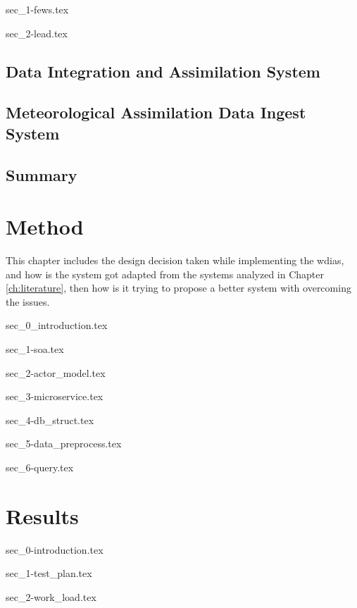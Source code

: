\documentclass[a4paper,oneside,12pt]{report}
\begin{document}
{sec_1-fews.tex}

{sec_2-lead.tex}

\section{Data Integration and Assimilation System}
\label{se:dias}

\section{Meteorological Assimilation Data Ingest System}
\label{se:madis}

\section{Summary}


\chapter{Method}
\label{ch:method}
This chapter includes the design decision taken while implementing the \acrfull{wdias}, and how is the system got adapted from the systems analyzed in Chapter \ref{ch:literature}, then how is it trying to propose a better system with overcoming the issues.

{sec_0_introduction.tex}
\label{se:method_intro}

{sec_1-soa.tex}
\label{se:soa}

{sec_2-actor_model.tex}
\label{se:actor_model}

{sec_3-microservice.tex}
\label{se:microservice}

{sec_4-db_struct.tex}
\label{se:db_struct}

{sec_5-data_preprocess.tex}
\label{se:data_preprocess}

{sec_6-query.tex}
\label{se:query}

\chapter{Results}
\label{ch:results}

{sec_0-introduction.tex}
\label{se:results_intro}

{sec_1-test_plan.tex}
\label{se:test_plan}

{sec_2-work_load.tex}
\label{se:work_load}
\end{document}
